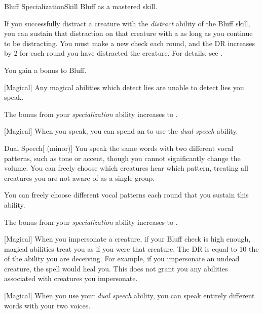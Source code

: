     \begin{feat}{Bluff Specialization}{Skill}
        \featpre Bluff as a mastered skill.

         If you successfully distract a creature with the \textit{distract} ability of the Bluff skill, you can sustain that distraction on that creature with a  as long as you continue to be distracting.
        You must make a new check each round, and the DR increases by 2 for each round you have distracted the creature.
        For details, see .

         You gain a  bonus to Bluff.

        [Magical] Any magical abilities which detect lies are unable to detect lies you speak.

         The bonus from your \textit{specialization} ability increases to .

        [Magical] When you speak, you can spend an  to use the \textit{dual speech} ability.
        \begin{ability}{Dual Speech}[ (minor)]
            You speak the same words with two different vocal patterns, such as tone or accent, though you cannot significantly change the volume.
            You can freely choose which creatures hear which pattern, treating all creatures you are not aware of as a single group.

            You can freely choose different vocal patterns each round that you sustain this ability.
        \end{ability}

         The bonus from your \textit{specialization} ability increases to .

        [Magical] When you impersonate a creature, if your Bluff check is high enough, magical abilities treat you as if you were that creature.
        The DR is equal to 10 \add the  of the ability you are deceiving.
        For example, if you impersonate an undead creature, the  spell would heal you.
        This does not grant you any abilities associated with creatures you impersonate.

        [Magical] When you use your \textit{dual speech} ability, you can speak entirely different words with your two voices.
    \end{feat}

